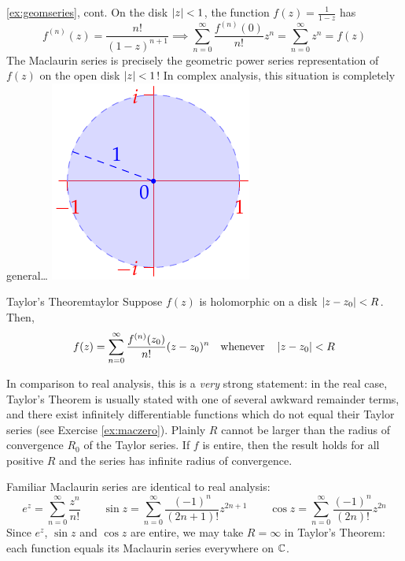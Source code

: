 \begin{example*}[exstyle,lower separated=false, sidebyside, sidebyside align=top seam, sidebyside gap=0pt, righthand width=0.26\linewidth]{\ref{ex:geomseries}, cont.}{}
	On the disk $\left| z\right|<1$, the function $f(z)=\frac 1{1-z}$ has 
  \[
  	f^{(n)}(z)=\frac{n!}{(1-z)^{n+1}}\implies \sum\limits_{n=0}^\infty\frac{f^{(n)}(0)}{n!}z^n =\sum\limits_{n=0}^\infty z^n = f(z)
  \]
  The Maclaurin series is precisely the geometric power series representation of $f(z)$ on the open disk $\left| z\right|<1$!\smallbreak
  In complex analysis, this situation is completely general\ldots
	\tcblower
  \flushright\includegraphics[scale=0.9]{taylorex1}
\end{example*}


\begin{thm}{Taylor's Theorem}{taylor}
	Suppose $f(z)$ is holomorphic on a disk $\left| z-z_0\right|<R$. Then,
	\[
		f(z)=\sum_{n=0}^\infty \frac{f^{(n)}(z_0)}{n!}(z-z_0)^n
		\quad\text{whenever}\quad
		\left| z-z_0\right|<R
	\]
\end{thm}

In comparison to real analysis, this is a \emph{very} strong statement: in the real case, Taylor's Theorem is usually stated with one of several awkward remainder terms, and there exist infinitely differentiable functions which do not equal their Taylor series (see Exercise \ref{ex:maczero}).\smallbreak
Plainly $R$ cannot be larger than the radius of convergence $R_0$ of the Taylor series. If $f$ is entire, then the result holds for all positive $R$ and the series has infinite radius of convergence.

\begin{examples}{}{}
	Familiar Maclaurin series are identical to real analysis:
	\[
		e^z=\sum\limits_{n=0}^\infty\frac{z^n}{n!}\qquad
		\sin z=\sum\limits_{n=0}^\infty\frac{(-1)^n}{(2n+1)!}z^{2n+1}\qquad
		\cos z=\sum\limits_{n=0}^\infty\frac{(-1)^n}{(2n)!}z^{2n}
	\]
	Since $e^z$, $\sin z$ and $\cos z$ are entire, we may take $R=\infty$ in Taylor's Theorem: each function equals its Maclaurin series everywhere on $\mathbb{C}$.
\end{examples}


